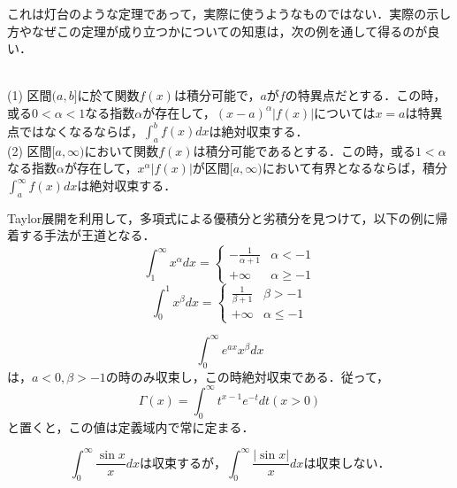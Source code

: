 \documentclass[uplatex, dvipdfmx]{jsreport}
\begin{document}
\begin{shadebox}これは灯台のような定理であって，実際に使うようなものではない．実際の示し方やなぜこの定理が成り立つかについての知恵は，次の例を通して得るのが良い．
    \begin{theorem}[広義積分の絶対収束するかの判定方法]　\\
        (1)\hspace{5mm} 区間$(a,b]$に於て関数$f(x)$は積分可能で，$a$が$f$の特異点だとする．この時，或る$0<\alpha <1$なる指数$\alpha$が存在して，$(x-a)^\alpha |f(x)|$については$x=a$は特異点ではなくなるならば，$\int^b_af(x)dx$は絶対収束する．\\
        (2)\hspace{5mm} 区間$[a,\infty)$において関数$f(x)$は積分可能であるとする．この時，或る$1<\alpha$なる指数$\alpha$が存在して，$x^\alpha |f(x)|$が区間$[a,\infty)$において有界となるならば，積分$\int^\infty_af(x)dx$は絶対収束する．
    \end{theorem}
\end{shadebox}

\begin{screen}
    \begin{example}\label{example-power}Taylor展開を利用して，多項式による優積分と劣積分を見つけて，以下の例に帰着する手法が王道となる．
        $$\int^\infty_1x^\alpha dx=\begin{cases}
            -\frac{1}{\alpha +1} & \alpha <-1 \\
            +\infty & \alpha \ge -1
        \end{cases}$$
        $$\int^1_0 x^\beta dx=\begin{cases}
            \frac{1}{\beta +1} & \beta >-1 \\
            +\infty & \alpha \le -1
        \end{cases}$$
    \end{example}
    \begin{example}\label{example gamma function}
        $$\int^\infty_0 e^{ax}x^\beta dx$$は，$a<0, \beta>-1$の時のみ収束し，この時絶対収束である．従って，
        $$\Gamma (x) = \int^\infty_0 t^{x-1} e^{-t}dt (x>0)$$と置くと，この値は定義域内で常に定まる．
    \end{example}
    \begin{example}\label{sin/x}
        $$\int^\infty_0\frac{\sin x}{x}dxは収束するが，\int^\infty_0\frac{|\sin x|}{x}dxは収束しない．$$
    \end{example}
\end{screen}
\end{document}

